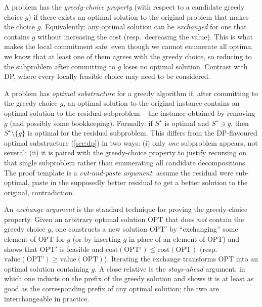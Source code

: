 \begin{definition}
\label{def:greedy_choice}
A problem has the \emph{greedy-choice property} (with respect to a candidate greedy choice $g$) if there exists an optimal solution to the original problem that makes the choice $g$. Equivalently: any optimal solution can be \emph{exchanged} for one that contains $g$ without increasing the cost (resp.\ decreasing the value). This is what makes the local commitment safe: even though we cannot enumerate all optima, we know that at least one of them agrees with the greedy choice, so reducing to the subproblem after committing to $g$ loses no optimal solution. Contrast with DP, where every locally feasible choice may need to be considered.
\end{definition}

\begin{definition}
\label{def:greedy_optimal_substructure}
A problem has \emph{optimal substructure} for a greedy algorithm if, after committing to the greedy choice $g$, an optimal solution to the original instance contains an optimal solution to the residual subproblem -- the instance obtained by removing $g$ (and possibly some bookkeeping). Formally: if $S^\star$ is optimal and $S^\star \ni g$, then $S^\star \setminus \{g\}$ is optimal for the residual subproblem. This differs from the DP-flavoured optimal substructure (\cref{sec:dp}) in two ways: (i) only \emph{one} subproblem appears, not several; (ii) it is paired with the greedy-choice property to justify recursing on that single subproblem rather than enumerating all candidate decompositions. The proof template is a \emph{cut-and-paste argument}: assume the residual were sub-optimal, paste in the supposedly better residual to get a better solution to the original, contradiction.
\end{definition}

\begin{definition}
\label{def:exchange_argument}
An \emph{exchange argument} is the standard technique for proving the greedy-choice property. Given an arbitrary optimal solution $\mathrm{OPT}$ that does \emph{not} contain the greedy choice $g$, one constructs a new solution $\mathrm{OPT}'$ by ``exchanging'' some element of $\mathrm{OPT}$ for $g$ (or by inserting $g$ in place of an element of $\mathrm{OPT}$) and shows that $\mathrm{OPT}'$ is feasible and $\mathrm{cost}(\mathrm{OPT}') \le \mathrm{cost}(\mathrm{OPT})$ (resp.\ $\mathrm{value}(\mathrm{OPT}') \ge \mathrm{value}(\mathrm{OPT})$). Iterating the exchange transforms $\mathrm{OPT}$ into an optimal solution containing $g$. A close relative is the \emph{stays-ahead} argument, in which one inducts on the prefix of the greedy solution and shows it is at least as good as the corresponding prefix of any optimal solution; the two are interchangeable in practice.
\end{definition}

